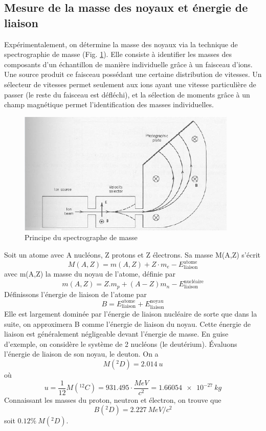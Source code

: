 \subsection{Mesure de la masse des noyaux et énergie de liaison}
Expérimentalement, on détermine la masse des noyaux via la technique de spectrographie de masse (Fig. \ref{fig:spectro_masse}). Elle consiste à identifier les masses des composants d'un échantillon de manière individuelle grâce à un faisceau d'ions. Une source produit ce faisceau possédant une certaine distribution de vitesses. Un sélecteur de vitesses permet seulement aux ions ayant une vitesse particulière de passer (le reste du faisceau est défléchi), et la sélection de moments grâce à un champ magnétique permet l'identification des masses individuelles.
\begin{figure}[ht]
    \centering
    \includegraphics[scale=0.80]{Images1/spectro.PNG}
    \caption{Principe du spectrographe de masse}
    \label{fig:spectro_masse}
\end{figure}
Soit un atome avec A nucléons, Z protons et Z électrons. Sa masse M(A,Z) s'écrit
\[
    M(A,Z) = m(A,Z) + Z \cdot m_e - E^{\text{atome}}_{\text{liaison}}
\]
avec m(A,Z) la masse du noyau de l'atome, définie par
\[
m(A,Z)=Z.m_p+(A-Z)m_n-E^{\text{nucléaire}}_{\text{liaison}}
\]
Définissons l'énergie de liaison de l'atome par
\[
    B=E^\text{atome}_\text{liaison}+E^{\text{noyau}}_{\text{liaison}}
\]
Elle est largement dominée par l'énergie de liaison nucléaire de sorte que dans la suite, on approximera B comme l'énergie de liaison du noyau. Cette énergie de liaison est généralement négligeable devant l'énergie de masse.
En guise d'exemple, on considère le système de 2 nucléons (le deutérium). Évaluons l'énergie de liaison de son noyau, le deuton. On a
\[
    M(^{2}_{}D)=2.014~u
\]
où \[u=\dfrac{1}{12}M(^{12}_{}C)=931.495 \cdot \dfrac{\si{MeV}}{c^2}=\SI{1.66054e-27}{kg}\]
Connaissant les masses du proton, neutron et électron, on trouve que
\[
    B(^{2}_{}D) = \SI{2.227}{MeV}/c^2
\]
soit $0.12\%~M(^{2}_{}D)$.

